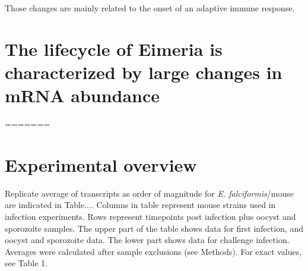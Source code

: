 \documentclass{bmcart}
\begin{document}
Those changes are mainly related to the onset of an
adaptive immune response.




\section*{The lifecycle of Eimeria is characterized by large changes in mRNA abundance}




=======
\section{Experimental overview}
Replicate average of transcripts as order of magnitude for \textit{E. falciformis}/mouse are indicated in Table.... Columns in table represent mouse strains used in infection experiments. Rows represent timepoints post infection plus oocyst and sporozoite samples. The upper part of the table shows data for first infection, and oocyst and sporozoite data. The lower part shows data for challenge infection. Averages were calculated after sample exclusions (see Methods). For exact values, see Table 1.
\end{document}
